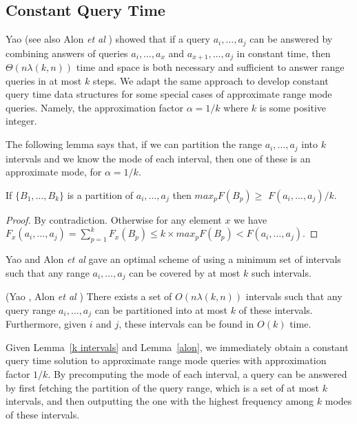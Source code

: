 \documentclass{llncs}
\begin{document}
\subsection{Constant Query Time}
Yao \cite{yao82} (see also Alon {\it et al} \cite{as87}) showed that if
a query $a_i, \ldots, a_j$ 
can be answered by combining answers of queries $a_i, \ldots, a_x$ and 
$a_{x + 1}, \ldots, a_j$ in constant time, then
$\Theta(n\lambda(k,n))$ time and space is both necessary and sufficient 
to answer range queries in at most $k$ steps. We adapt the same
approach to develop constant query time data structures for some
special cases of approximate range mode queries. Namely, the
approximation factor $\alpha = 1/k$ where $k$ is some positive integer.

The following lemma says that, if we can partition the range 
$a_i,\ldots,a_j$ into $k$ intervals and we know the mode of each 
interval, then one of these is an approximate mode, for $\alpha = 1/k$.

\begin{lemma}\label{k intervals}If $\{B_1,\ldots,B_k\}$ is a partition 
of $a_i,\ldots,a_j$ then $max_pF(B_p) \geq$ \linebreak[4] $F(a_i, \ldots, a_j)/k$.
\end{lemma}
\begin{proof}
By contradiction. Otherwise for any element $x$ we have 
$F_x(a_i,\ldots,a_j) = \sum_{p=1}^{k}F_x(B_p) 
\leq k \times max_pF(B_p) <  F(a_i, \ldots, a_j)$.
\end{proof}

Yao \cite{yao82} and Alon {\it et al} \cite{as87} gave an optimal 
scheme of using a minimum set of intervals  
such that any range $a_i,\ldots,a_j$ can be covered by at most $k$ such intervals. 

\begin{lemma}\label{alon}(Yao \cite{yao82}, Alon {\it et al} \cite{as87})
  There exists a set of
 $O(n\lambda(k,n))$ intervals such that
any query range $a_i, \ldots, a_j$ can be partitioned into at 
most $k$ of these intervals. Furthermore, given $i$ and $j$, 
these intervals can be found in $O(k)$ time.
\end{lemma}

Given Lemma~\ref{k intervals} and Lemma~\ref{alon}, we 
immediately obtain a constant query time solution to 
approximate range mode queries with approximation factor $1/k$.
By precomputing the mode of each interval, a query can be answered 
by first fetching the partition of the 
query range, which is a set of at most $k$ intervals, and then 
outputting the one with the highest frequency among $k$ modes of these intervals.  
\end{document}
